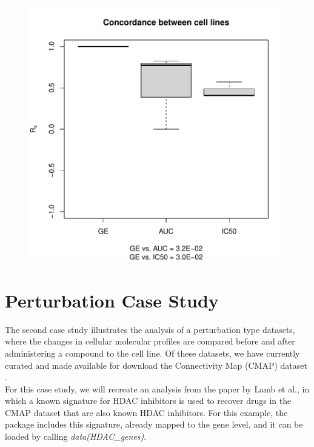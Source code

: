 \documentclass[11pt]{article}
\begin{document}
\begin{figure}[H!]
\begin{center}
\includegraphics{PharmacoGx-fig2}
\end{center}
\label{fig:one}
\end{figure}

\section{Perturbation Case Study}

The second case study illustrates the analysis of a perturbation type datasets, where the changes in cellular molecular profiles are compared before and after administering a compound to the cell line. Of these datasets, we have currently curated and made available for download the Connectivity Map (CMAP) dataset \cite{Lamb:2006hf}. \\

For this case study, we will recreate an analysis from the paper by Lamb et al., in which a known signature for HDAC inhibitors \cite{Glaser:2003gk} is used to recover drugs in the CMAP dataset that are also known HDAC inhibitors. For this example, the package includes this signature, already mapped to the gene level, and it can be loaded by calling \textit{data(HDAC\_genes)}.
\end{document}
